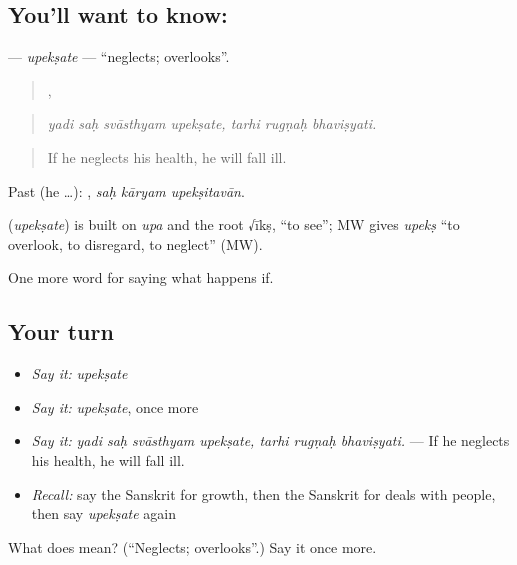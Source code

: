 \subsection*{You'll want to know: }
\textbf{} — \emph{upekṣate} — \textquotedblleft{}neglects; overlooks\textquotedblright{}.

\begin{quote}
   ,   
\end{quote}

\begin{quote}
\emph{yadi saḥ svāsthyam upekṣate, tarhi rugṇaḥ bhaviṣyati.}
\end{quote}

\begin{quote}
If he neglects his health, he will fall ill.
\end{quote}

Past (he …):   , \emph{saḥ kāryam upekṣitavān}.

\begin{cousinweb}
\textbf{} (\emph{upekṣate}) is built on \emph{upa} and the root √īkṣ, \textquotedblleft{}to see\textquotedblright{}; MW gives \emph{upekṣ} \textquotedblleft{}to overlook, to disregard, to neglect\textquotedblright{} (MW).
\end{cousinweb}

\begin{grammarlens}[title={What you've built}]
One more word for saying what happens if.
\end{grammarlens}

\subsection*{Your turn}
\begin{itemize}
\raggedright
  \item \emph{Say it:} \emph{upekṣate}
  \item \emph{Say it:} \emph{upekṣate}, once more
  \item \emph{Say it:} \emph{yadi saḥ svāsthyam upekṣate, tarhi rugṇaḥ bhaviṣyati.} — If he neglects his health, he will fall ill.
  \item \emph{Recall:} say the Sanskrit for growth, then the Sanskrit for deals with people, then say \emph{upekṣate} again
\end{itemize}

\begin{tcolorbox}[breakable,colback=teal!4,colframe=teal!35!black,title={Before you move on}]
What does  mean? (\textquotedblleft{}Neglects; overlooks\textquotedblright{}.) Say it once more.
\end{tcolorbox}
